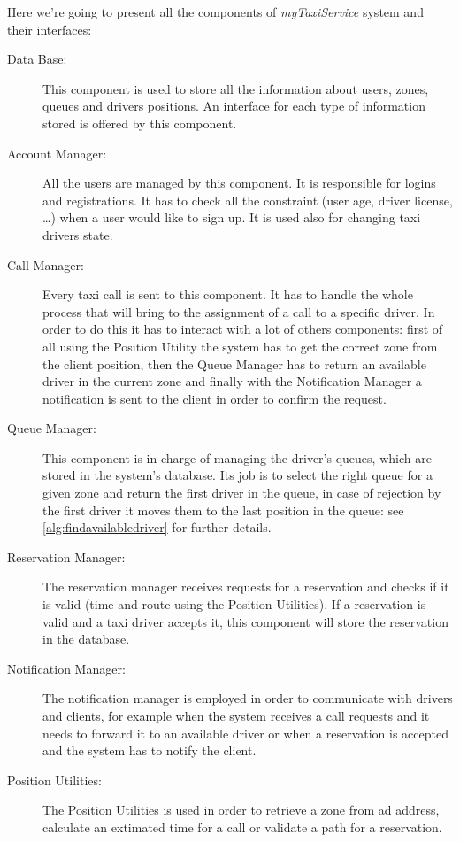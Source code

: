 \documentclass[a4paper]{article}
\begin{document}
Here we're going to present all the components of \emph{myTaxiService} system and their interfaces:

\begin{description}
\item[Data Base:] This component is used to store all the information about users, zones, queues and  drivers positions. An interface for each type of information stored is offered by this component.
\item[Account Manager:] All the users are managed by this component. It is responsible for logins and registrations. It has to check all the constraint (user age, driver license, \ldots) when a user would like to sign up. It is used also for changing taxi drivers state.
\item[Call Manager:] Every taxi call is sent to this component. It has to handle the whole process that will bring to the assignment of a call to a specific driver. In order to do this it has to interact with a lot of others components: first of all using the Position Utility the system has to get the correct zone from the client position, then the Queue Manager has to return an available driver in the current zone and finally with the Notification Manager a notification is sent to the client in order to confirm the request.
\item[Queue Manager:] This component is in charge of managing the driver's queues, which are stored in the system's database. Its job is to select the right queue for a given zone and return the first driver in the queue, in case of rejection by the first driver it moves them to the last position in the queue: see \autoref{alg:findavailabledriver}  for further details.
\item[Reservation Manager:] The reservation manager receives requests for a reservation and checks if it is valid (time and route using the Position Utilities). If a reservation is valid and a taxi driver accepts it, this component will store the reservation in the database.
\item[Notification Manager:] The notification manager is employed in order to communicate with drivers and clients, for example when the system receives a call requests and it needs to forward it to an available driver or when a reservation is accepted and the system has to notify the client.
\item[Position Utilities:] The Position Utilities is used in order to retrieve a zone from ad address, calculate an extimated time for a call or validate a path for a reservation.
\end{description}
\end{document}
